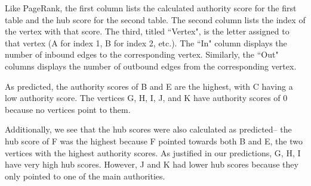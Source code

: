 \documentclass[12pt, titlepage, twoside]{amsart}
\begin{document}
Like PageRank, the first column lists the calculated
authority score for the first table and the hub score for the second table.
The second column lists the index of the vertex with that score.
The third, titled ``Vertex", is the letter assigned to that vertex (A for index 1, B for index 2, etc.).
The ``In" column displays the number of inbound edges to the corresponding vertex.
Similarly, the ``Out" columns displays the number of outbound edges from the corresponding vertex.

As predicted, the authority scores of B and E are the highest, with C having a low authority score.
The vertices G, H, I, J, and K have authority scores of 0 because no vertices point to them.

Additionally, we see that the hub scores were also calculated as predicted--
the hub score of F was the highest because F pointed towards both B and E,
the two vertices with the highest authority scores. As justified in our predictions, G, H, I
have very high hub scores. However, J and K had lower hub scores because they only pointed to one of the main authorities.
\end{document}
